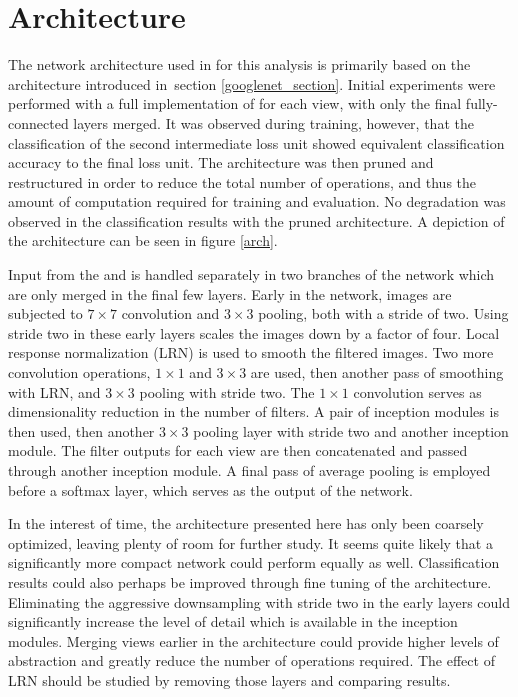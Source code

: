\section{Architecture}

The network architecture used in for this analysis is primarily based on
the \googlenet architecture \cite{szegedy2014going} introduced in section
\ref{googlenet_section}.
Initial experiments were performed with a full implementation of \googlenet
for each view, with only the final fully-connected layers merged.
It was observed during training, however,
that the classification of the second intermediate
loss unit showed equivalent classification accuracy to the final loss unit.
The architecture was then pruned and restructured in order to reduce
the total number of operations, and thus the amount of computation required
for training and evaluation.
No degradation was observed in the classification results with the pruned
architecture.
A depiction of the architecture can be seen in figure \ref{arch}.

Input from the \xview and \yview is handled separately in two branches of the
network which are only merged in the final few layers.
Early in the network, images are subjected to $7\times7$ convolution and
$3\times3$ pooling, both with a stride of two.
Using stride two in these early layers scales the images down by a factor of
four.
Local response normalization (LRN) \cite{krizhevsky2012imagenet} is used
to smooth the filtered images.  Two more convolution operations, $1\times1$
and $3\times3$ are used, then another pass of smoothing with LRN, and
$3\times3$ pooling with stride two.  The $1\times1$ convolution serves
as dimensionality reduction in the number of filters.
A pair of inception modules is then used, then another $3\times3$ pooling layer
with stride two and another inception module.  The filter outputs for each view
are then concatenated and passed through another inception module.  A final
pass of average pooling is employed before a softmax layer, which serves as
the output of the network.


In the interest of time, the architecture presented here has only been coarsely
optimized, leaving plenty of room for further study.
It seems quite likely that a significantly more compact network could perform
equally as well.
Classification results could also perhaps be improved through fine tuning of
the architecture.
Eliminating the aggressive downsampling with stride two in the early layers
could significantly increase the level of detail which is available in the
inception modules.
Merging views earlier in the architecture could provide higher levels of
abstraction and greatly reduce the number of operations required.
The effect of LRN should be studied by removing those layers and
comparing results.

